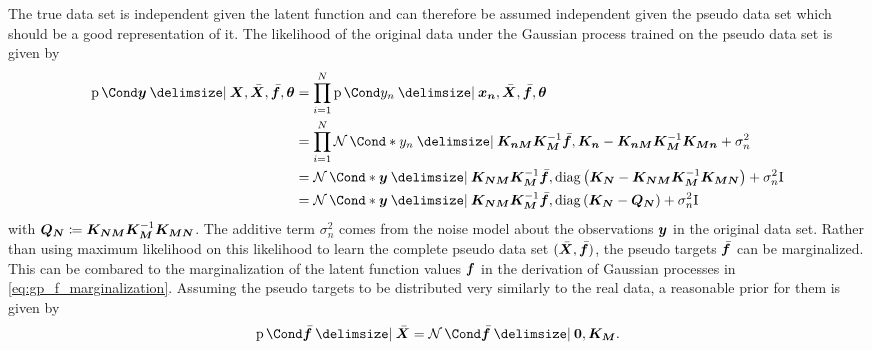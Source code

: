 The true data set is independent given the latent function and can therefore be assumed independent given the pseudo data set which should be a good representation of it.
The likelihood of the original data under the Gaussian process trained on the pseudo data set is given by
\begin{align}
    \Prob{\mat{y} \given \mat{X}, \ps{\mat{X}}, \ps{\mat{f}}, \mat{\theta}} &= \prod_{i=1}^N \Prob{y_n \given \mat{x_n}, \ps{\mat{X}}, \ps{\mat{f}}, \mat{\theta}} \\
    &= \prod_{i=1}^N \Gaussian*{y_n \given \mat{K_{n M}}\mat{K_M}^{-1} \ps{\mat{f}}, \mat{K_n} - \mat{K_{n M}} \mat{K_M}^{-1} \mat{K_{M n}} + \sigma_n^2} \\
    &= \Gaussian*{\mat{y} \given \mat{K_{N M}}\mat{K_M}^{-1} \ps{\mat{f}}, \diag\left( \mat{K_N} - \mat{K_{N M}} \mat{K_M}^{-1} \mat{K_{M N}} \right) + \sigma_n^2 \Eye} \\
    &= \Gaussian*{\mat{y} \given \mat{K_{N M}}\mat{K_M}^{-1} \ps{\mat{f}}, \diag\left( \mat{K_N} - \mat{Q_N} \right) + \sigma_n^2 \Eye}
\end{align}
with $\bm{Q_N} \coloneqq \bm{K_{N M}} \bm{K_M}^{-1} \bm{K_{M N}}$.
The additive term $\sigma_n^2$ comes from the noise model about the observations $\bm{y}$ in the original data set.
Rather than using maximum likelihood on this likelihood to learn the complete pseudo data set $(\bar{\bm{X}}, \bar{\bm{f}})$, the pseudo targets $\bar{\bm{f}}$ can be marginalized.
This can be combared to the marginalization of the latent function values $\bm{f}$ in the derivation of Gaussian processes in \cref{eq:gp_f_marginalization}.
Assuming the pseudo targets to be distributed very similarly to the real data, a reasonable prior for them is given by
\begin{align}
    \Prob{\ps{\mat{f}} \given \ps{\mat{X}}} = \Gaussian{\ps{\mat{f}} \given \mat{0}, \mat{K_M}}.
\end{align}

